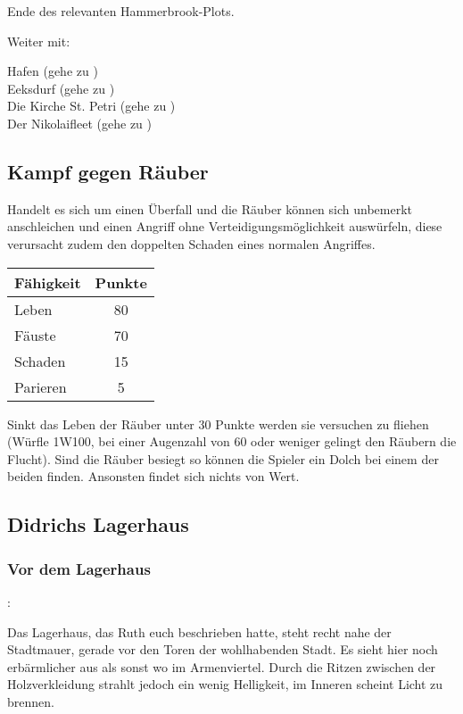 Ende des relevanten Hammerbrook-Plots.

Weiter mit:

Hafen (gehe zu \blue{\ref{Hafen}}) \\
Eeksdurf (gehe zu \blue{\ref{xd}}) \\
Die Kirche St. Petri (gehe zu \blue{\ref{Petri}}) \\
Der Nikolaifleet (gehe zu \blue{\ref{Fleet}}) \\

\subsection{Kampf gegen Räuber}
\label{kampf2}

Handelt es sich um einen Überfall und die Räuber können sich unbemerkt anschleichen und einen Angriff ohne Verteidigungsmöglichkeit auswürfeln, diese verursacht zudem den doppelten Schaden eines normalen Angriffes.

\begin{center}
  \begin{tabular}{lc}
    \toprule
    Fähigkeit & Punkte \\
    \midrule
    Leben & 80 \\
    Fäuste & 70 \\
    Schaden & 15 \\
    Parieren & 5 \\
    \bottomrule
  \end{tabular}
\end{center}

Sinkt das Leben der Räuber unter 30 Punkte werden sie versuchen zu fliehen (Würfle 1W100, bei einer Augenzahl von 60 oder weniger gelingt den Räubern die Flucht).
Sind die Räuber besiegt so können die Spieler ein Dolch bei einem der beiden finden. Ansonsten findet sich nichts von Wert.

\subsection{Didrichs Lagerhaus}
\label{Lagerhaus}

\subsubsection{Vor dem Lagerhaus}

:

Das Lagerhaus, das Ruth euch beschrieben hatte, steht recht nahe der Stadtmauer, gerade vor den Toren der wohlhabenden Stadt. Es sieht hier noch erbärmlicher aus als sonst wo im Armenviertel. Durch die Ritzen zwischen der Holzverkleidung strahlt jedoch ein wenig Helligkeit, im Inneren scheint Licht zu brennen.

